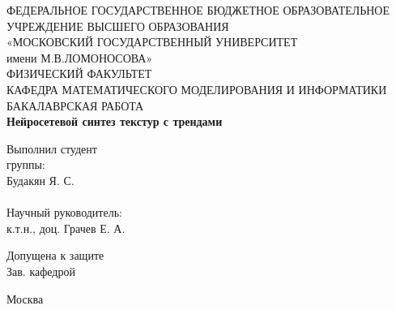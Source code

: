 \begin{titlepage} %
	
	\begin{center}
		\footnotesize{ФЕДЕРАЛЬНОЕ ГОСУДАРСТВЕННОЕ БЮДЖЕТНОЕ ОБРАЗОВАТЕЛЬНОЕ }\\ 
		\footnotesize{УЧРЕЖДЕНИЕ ВЫСШЕГО ОБРАЗОВАНИЯ}\\
		\small{«МОСКОВСКИЙ ГОСУДАРСТВЕННЫЙ УНИВЕРСИТЕТ}\\
		\small{имени М.В.ЛОМОНОСОВА»}\\
		\hfill \break
		\normalsize{ФИЗИЧЕСКИЙ ФАКУЛЬТЕТ}\\
		\hfill \break
		\normalsize{КАФЕДРА МАТЕМАТИЧЕСКОГО МОДЕЛИРОВАНИЯ И ИНФОРМАТИКИ}\\
		\hfill \break
		\hfill \break
		\hfill \break
		\hfill \break
		\hfill \break
		\normalsize{БАКАЛАВРСКАЯ РАБОТА}\\
		\hfill \break
		\large{\textbf{Нейросетевой синтез текстур с трендами}}\\
	\end{center}
	
	\hfill \break

	\begin{flushright}
		Выполнил студент \\
		\hfill {} группы:\\
		\hfill \break
		Будакян Я. С.\\
		\hfill \break
		\underline{\hspace{3cm}}\\
		\hfill \break
		\hfill \break
		Научный руководитель: \\
		\hfill \break
		к.т.н., доц. Грачев Е. А.\\
		\hfill \break
		\underline{\hspace{3cm}}
	\end{flushright}
	
	\hfill \break
	\hfill \break
	\hfill \break
	
	Допущена к защите\\
	
	Зав. кафедрой \underline{\hspace{3cm}}\\
	
	\hfill \break
	\hfill \break
	\hfill \break
	
	\begin{center}
		Москва \\
		\hfill {} 
	\end{center}
	
	\thispagestyle{empty} %
	

\end{titlepage}  %